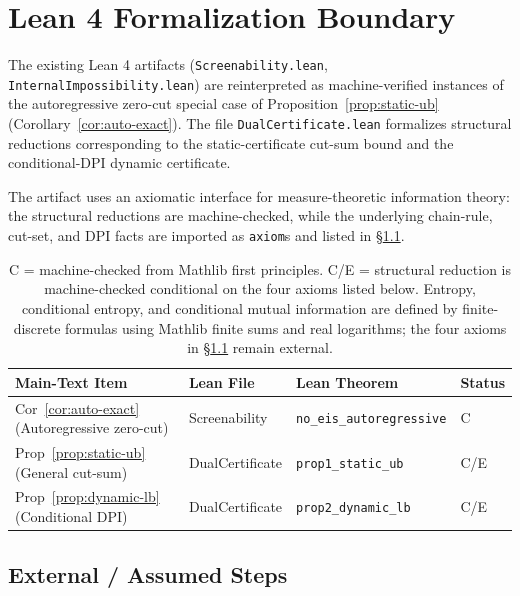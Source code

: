 \documentclass{article}
\begin{document}
\section{Lean 4 Formalization Boundary}
\label{app:lean-boundary}

The existing Lean 4 artifacts (\texttt{Screenability.lean}, \texttt{InternalImpossibility.lean}) are reinterpreted as machine-verified instances of the autoregressive zero-cut special case of Proposition~\ref{prop:static-ub} (Corollary~\ref{cor:auto-exact}). The file \texttt{DualCertificate.lean} formalizes structural reductions corresponding to the static-certificate cut-sum bound and the conditional-DPI dynamic certificate.

The artifact uses an axiomatic interface for measure-theoretic information theory: the structural reductions are machine-checked, while the underlying chain-rule, cut-set, and DPI facts are imported as \texttt{axiom}s and listed in \S\ref{sec:external-axioms}.

\begin{table}[h]
\centering
\small
\begin{tabular}{llll}
\toprule
Main-Text Item & Lean File & Lean Theorem & Status \\
\midrule
Cor~\ref{cor:auto-exact} (Autoregressive zero-cut) & Screenability & \texttt{no\_eis\_autoregressive} & C \\
Prop~\ref{prop:static-ub} (General cut-sum) & DualCertificate & \texttt{prop1\_static\_ub} & C/E \\
Prop~\ref{prop:dynamic-lb} (Conditional DPI) & DualCertificate & \texttt{prop2\_dynamic\_lb} & C/E \\
\bottomrule
\end{tabular}
\caption{C = machine-checked from Mathlib first principles. C/E = structural reduction is machine-checked conditional on the four axioms listed below. Entropy, conditional entropy, and conditional mutual information are defined by finite-discrete formulas using Mathlib finite sums and real logarithms; the four axioms in \S\ref{sec:external-axioms} remain external.}
\label{tab:lean}
\end{table}

\subsection{External / Assumed Steps}
\label{sec:external-axioms}
\end{document}
